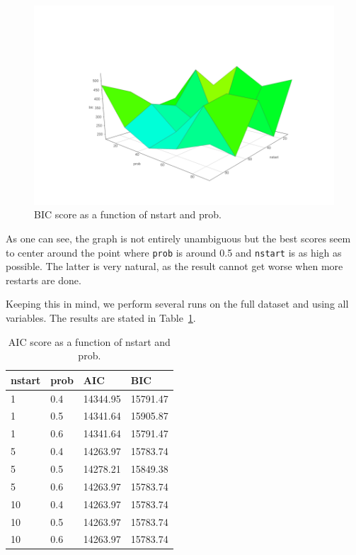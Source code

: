 \documentclass[12pt]{article}
\theoremstyle{definition}
\begin{document}
\begin{figure}[H]
    \centering
    \includegraphics[width=0.8\linewidth]{rough2.png}
    \caption{BIC score as a function of nstart and prob.}
\label{fig:rough}
\end{figure}

As one can see, the graph is not entirely unambiguous but the best scores seem to
center around the point where \texttt{prob} is around 0.5 and \texttt{nstart} is as high as possible.
The latter is very natural, as the result cannot get worse when more restarts are done.

Keeping this in mind, we perform several runs on the full dataset and using all variables.
The results are stated in Table~\ref{table1}.

\begin{table}[H]
\centering
\begin{tabular}{llll}
    nstart & prob & AIC & BIC \\
    \hline \hline
    1 & 0.4 & 14344.95 & 15791.47 \\
    1 & 0.5 & 14341.64 & 15905.87 \\
    1 & 0.6 & 14341.64 & 15791.47 \\
    5 & 0.4 & 14263.97 & 15783.74 \\
    5 & 0.5 & 14278.21 & 15849.38 \\
    5 & 0.6 & 14263.97 & 15783.74 \\
    10 & 0.4 & 14263.97 & 15783.74 \\
    10 & 0.5 & 14263.97 & 15783.74 \\
    10 & 0.6 & 14263.97 & 15783.74 \\
\end{tabular}
\caption{AIC score as a function of nstart and prob.}
\label{table1}
\end{table}
\end{document}
